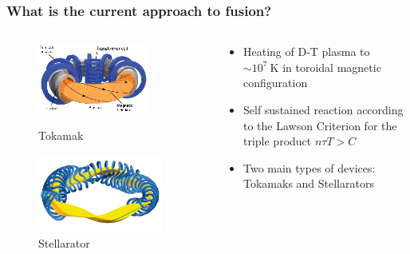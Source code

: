 \documentclass{beamer}
\begin{document}
\begin{frame}
\frametitle{What is the current approach to fusion?}
\vspace{-1.5 cm}
\begin{columns}[onlytextwidth]
	\begin{column}{0.45\textwidth}
		\begin{center}
		\begin{figure}
			\includegraphics[trim={0 0 0 0cm},clip,width=0.8\textwidth]{FIGURES/Schematic-of-a-Tokamak-fusion-reactor-Source-Fusion-for-energy.eps}
			\caption{Tokamak}
					\includegraphics[trim={0 0 0 0cm},clip,width=0.9\textwidth]{FIGURES/W7X-Spulen_Plasma_blau_gelb.jpg}
		\caption{Stellarator}
		\end{figure}
		\end{center}
	\end{column}
	\begin{column}{0.45\textwidth}
		\vspace{0 cm}
		\begin{center}
			\begin{itemize}
				\item Heating of D-T plasma to $\sim10^7~\text{K}$ in toroidal magnetic configuration
				\item Self sustained reaction according to the Lawson Criterion for the triple product $n\tau T > C$
				\item Two main types of devices: Tokamaks and Stellarators
			\end{itemize}
		\end{center}
	\end{column}
\end{columns}
 \end{frame}
\end{document}
